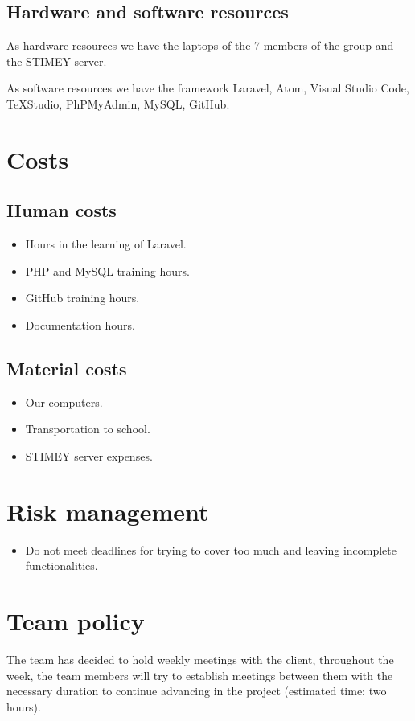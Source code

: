 \subsection{Hardware and software resources}
As hardware resources we have the laptops of the 7 members of the group and the STIMEY server.

As software resources we have the framework Laravel, Atom, Visual Studio Code, TeXStudio, PhPMyAdmin, MySQL, GitHub.

\section{Costs}
\subsection{Human costs}
\begin{itemize}
	\item Hours in the learning of Laravel.
	\item PHP and MySQL training hours.
	\item GitHub training hours.
	\item Documentation hours.
\end{itemize}

\subsection{Material costs}
\begin{itemize}
	\item Our computers.
	\item Transportation to school.
	\item STIMEY server expenses.
\end{itemize}

\section{Risk management}
\begin{itemize}
	\item Do not meet deadlines for trying to cover too much and leaving incomplete functionalities.
\end{itemize}

\section{Team policy}
The team has decided to hold weekly meetings with the client, throughout the week, the team members will try to establish meetings between them with the necessary duration to continue advancing in the project (estimated time: two hours).

